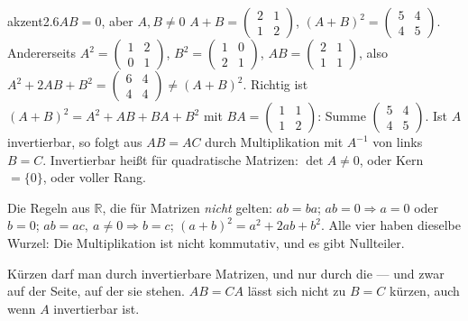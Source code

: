 \begin{loesungkarte}{akzent}{2.6}{$AB = 0$, aber $A, B\neq0$}
$A + B = \begin{pmatrix}2 & 1\\ 1 & 2\end{pmatrix}$, $(A + B)^{2} = \begin{pmatrix}5 & 4\\ 4 & 5\end{pmatrix}$. Andererseits $A^{2} = \begin{pmatrix}1 & 2\\ 0 & 1\end{pmatrix}$, $B^{2} = \begin{pmatrix}1 & 0\\ 2 & 1\end{pmatrix}$, $AB = \begin{pmatrix}2 & 1\\ 1 & 1\end{pmatrix}$, also $A^{2} + 2AB + B^{2} = \begin{pmatrix}6 & 4\\ 4 & 4\end{pmatrix}\neq(A + B)^{2}$. Richtig ist $(A + B)^{2} = A^{2} + AB + BA + B^{2}$ mit $BA = \begin{pmatrix}1 & 1\\ 1 & 2\end{pmatrix}$: Summe $\begin{pmatrix}5 & 4\\ 4 & 5\end{pmatrix}$. \checkmark
{}
Ist $A$ invertierbar, so folgt aus $AB = AC$ durch Multiplikation mit $A^{-1}$ von links $B = C$. Invertierbar heißt für quadratische Matrizen: $\det A\neq0$, oder Kern $= \{0\}$, oder voller Rang.
\begin{fehler}\kastentext
Die Regeln aus $\mathbb R$, die für Matrizen \emph{nicht} gelten: $ab = ba$; $ab = 0\Rightarrow a = 0$ oder $b = 0$; $ab = ac,\ a\neq0\Rightarrow b = c$; $(a + b)^{2} = a^{2} + 2ab + b^{2}$. Alle vier haben dieselbe Wurzel: Die Multiplikation ist nicht kommutativ, und es gibt Nullteiler.
\end{fehler}
\begin{mitnehmen}\kastentext
Kürzen darf man durch invertierbare Matrizen, und nur durch die --- und zwar auf der Seite, auf der sie stehen. $AB = CA$ lässt sich nicht zu $B = C$ kürzen, auch wenn $A$ invertierbar ist.
\end{mitnehmen}
\end{loesungkarte}

